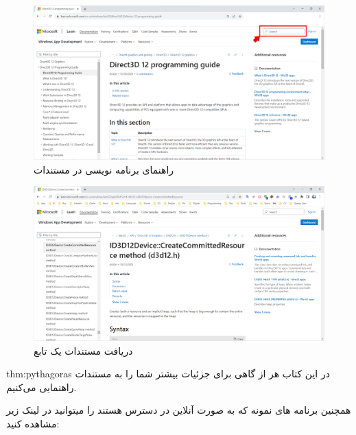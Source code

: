 {    \begin{figure}[!]
        \centering
        \setlength{\belowcaptionskip}{-10pt}
        \includegraphics[width=\textwidth]{Images/3/3.Intro.1.1}
        \caption{راهنمای برنامه نویسی  در مستندات }
        \label{fig:3.Intro.1.1}
    \end{figure}

    \begin{figure}[!]
        \centering
        \setlength{\belowcaptionskip}{-10pt}
        \includegraphics[width=\textwidth]{Images/3/3.Intro.1.2}
        \caption{دریافت مستندات یک تابع}
        \label{fig:3.Intro.1.2}
    \end{figure}

    \begin{theo}{thm:pythagoras}
        در این کتاب هر از گاهی برای جزئیات بیشتر شما را به مستندات راهنمایی می‌کنیم.
    \end{theo}
    همچنین برنامه های نمونه  که به صورت آنلاین در دسترس هستند را میتوانید در لینک زیر مشاهده کنید:

}
